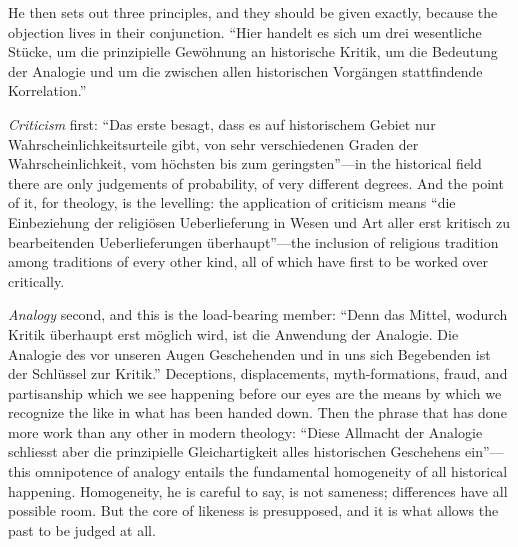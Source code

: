 He then sets out three principles, and they should be given exactly, because the objection lives in their conjunction. ``Hier handelt es sich um drei wesentliche St\"ucke, um die prinzipielle Gew\"ohnung an historische Kritik, um die Bedeutung der Analogie und um die zwischen allen historischen Vorg\"angen stattfindende Korrelation.''

\emph{Criticism} first: ``Das erste besagt, dass es auf historischem Gebiet nur Wahrscheinlichkeitsurteile gibt, von sehr verschiedenen Graden der Wahrscheinlichkeit, vom h\"ochsten bis zum geringsten''---in the historical field there are only judgements of probability, of very different degrees. And the point of it, for theology, is the levelling: the application of criticism means ``die Einbeziehung der religi\"osen Ueberlieferung in Wesen und Art aller erst kritisch zu bearbeitenden Ueberlieferungen \"uberhaupt''---the inclusion of religious tradition among traditions of every other kind, all of which have first to be worked over critically.

\emph{Analogy} second, and this is the load-bearing member: ``Denn das Mittel, wodurch Kritik \"uberhaupt erst m\"oglich wird, ist die Anwendung der Analogie. Die Analogie des vor unseren Augen Geschehenden und in uns sich Begebenden ist der Schl\"ussel zur Kritik.'' Deceptions, displacements, myth-formations, fraud, and partisanship which we see happening before our eyes are the means by which we recognize the like in what has been handed down. Then the phrase that has done more work than any other in modern theology: ``Diese Allmacht der Analogie schliesst aber die prinzipielle Gleichartigkeit alles historischen Geschehens ein''---this omnipotence of analogy entails the fundamental homogeneity of all historical happening. Homogeneity, he is careful to say, is not sameness; differences have all possible room. But the core of likeness is presupposed, and it is what allows the past to be judged at all.

